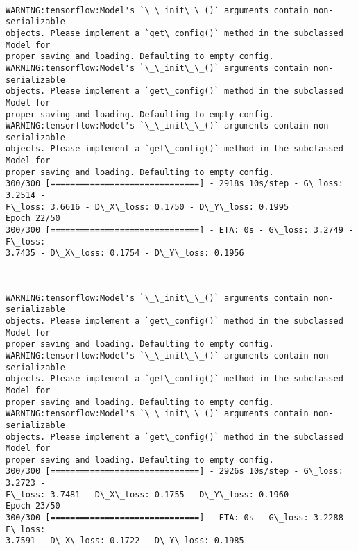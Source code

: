 \documentclass[11pt]{article}
\begin{document}
    \begin{center}
    \end{center}
    { \hspace*{\fill} \\}
    
    \begin{Verbatim}[commandchars=\\\{\}]
WARNING:tensorflow:Model's `\_\_init\_\_()` arguments contain non-serializable
objects. Please implement a `get\_config()` method in the subclassed Model for
proper saving and loading. Defaulting to empty config.
WARNING:tensorflow:Model's `\_\_init\_\_()` arguments contain non-serializable
objects. Please implement a `get\_config()` method in the subclassed Model for
proper saving and loading. Defaulting to empty config.
WARNING:tensorflow:Model's `\_\_init\_\_()` arguments contain non-serializable
objects. Please implement a `get\_config()` method in the subclassed Model for
proper saving and loading. Defaulting to empty config.
300/300 [==============================] - 2918s 10s/step - G\_loss: 3.2514 -
F\_loss: 3.6616 - D\_X\_loss: 0.1750 - D\_Y\_loss: 0.1995
Epoch 22/50
300/300 [==============================] - ETA: 0s - G\_loss: 3.2749 - F\_loss:
3.7435 - D\_X\_loss: 0.1754 - D\_Y\_loss: 0.1956
    \end{Verbatim}

    \begin{center}
    \end{center}
    { \hspace*{\fill} \\}
    
    \begin{Verbatim}[commandchars=\\\{\}]
WARNING:tensorflow:Model's `\_\_init\_\_()` arguments contain non-serializable
objects. Please implement a `get\_config()` method in the subclassed Model for
proper saving and loading. Defaulting to empty config.
WARNING:tensorflow:Model's `\_\_init\_\_()` arguments contain non-serializable
objects. Please implement a `get\_config()` method in the subclassed Model for
proper saving and loading. Defaulting to empty config.
WARNING:tensorflow:Model's `\_\_init\_\_()` arguments contain non-serializable
objects. Please implement a `get\_config()` method in the subclassed Model for
proper saving and loading. Defaulting to empty config.
300/300 [==============================] - 2926s 10s/step - G\_loss: 3.2723 -
F\_loss: 3.7481 - D\_X\_loss: 0.1755 - D\_Y\_loss: 0.1960
Epoch 23/50
300/300 [==============================] - ETA: 0s - G\_loss: 3.2288 - F\_loss:
3.7591 - D\_X\_loss: 0.1722 - D\_Y\_loss: 0.1985
    \end{Verbatim}
\end{document}
